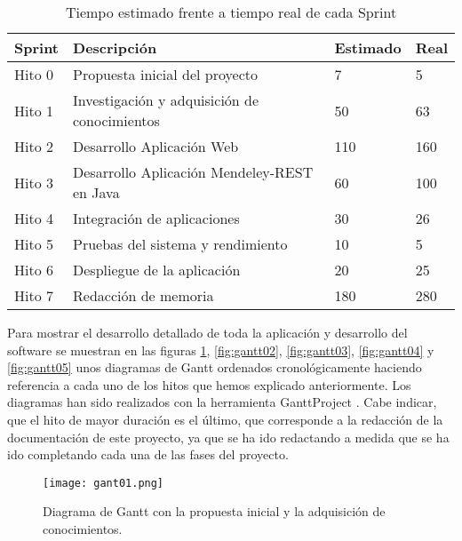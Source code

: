 \begin{table}[!hbt]
	\begin{center}
		\begin{tabular}{|p{2cm}|p{6cm}|p{2.5cm}|p{2.5cm}|}
			\hline
			\textbf{Sprint} & \textbf{Descripción} & \textbf{Estimado} & \textbf{Real}\\
			\hline
			Hito 0 & Propuesta inicial del proyecto & 7 & 5\\
			\hline
			Hito 1 & Investigación y adquisición de conocimientos & 50 & 63\\
			\hline
			Hito 2 & Desarrollo Aplicación Web & 110 & 160\\
			\hline
			Hito 3 & Desarrollo Aplicación Mendeley-REST en Java & 60 & 100\\
			\hline
			Hito 4 & Integración de aplicaciones & 30 & 26\\
			\hline
			Hito 5 & Pruebas del sistema y rendimiento & 10 & 5\\
			\hline
			Hito 6 & Despliegue de la aplicación & 20 & 25\\
			\hline
			Hito 7 & Redacción de memoria & 180 & 280\\
			\hline
		\end{tabular}
		\caption{Tiempo estimado frente a tiempo real de cada Sprint}
		\label{table:hitos}
	\end{center}
\end{table}

Para mostrar el desarrollo detallado de toda la aplicación y desarrollo del software se muestran en las figuras \ref{fig:gantt01}, \ref{fig:gantt02}, \ref{fig:gantt03}, \ref{fig:gantt04} y \ref{fig:gantt05} unos diagramas de Gantt ordenados cronológicamente haciendo referencia a cada uno de los hitos que hemos explicado anteriormente. Los diagramas han sido realizados con la herramienta GanttProject \cite{gantt15}. Cabe indicar, que el hito de mayor duración es el último, que corresponde a la redacción de la documentación de este proyecto, ya que se ha ido redactando a medida que se ha ido completando cada una de las fases del proyecto.\\

\begin{figure}[h!]
	\begin{center}
		\texttt{[image: gant01.png]}
		\caption{Diagrama de Gantt con la propuesta inicial y la adquisición de conocimientos.}
		\label{fig:gantt01}
	\end{center}
\end{figure}

